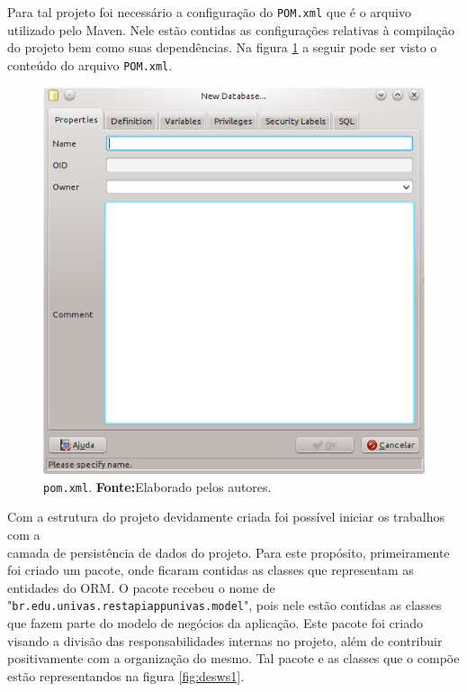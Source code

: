 	\par Para tal projeto foi necessário a configuração do \texttt{POM.xml} que é o
arquivo utilizado pelo Maven. Nele estão contidas as configurações
relativas à compilação do projeto bem como suas dependências.  Na figura
\ref{fig:desws} a seguir pode ser visto o conteúdo do arquivo
\texttt{POM.xml}.

\begin{figure}[h!]
	\centerline{\includegraphics[scale=0.8]{./imagens/2_q_metodologico/4_procedimentos_resultados/43_webservice/432_desenvolvimento/desws1.png}}
	\caption[\texttt{pom.xml}]{\texttt{pom.xml}.
		\textbf{Fonte:}Elaborado pelos autores.}
	\label{fig:desws}
\end{figure}

	

	\par Com a estrutura do projeto devidamente criada foi possível iniciar os
trabalhos com a \\ camada de persistência de dados do projeto. Para este
propósito, primeiramente foi criado um pacote, onde ficaram contidas as classes
que representam as entidades do ORM. O pacote recebeu o nome de
"\texttt{br.edu.univas.restapiappunivas.model}", pois nele estão contidas as
classes que fazem parte do modelo de negócios da aplicação. Este pacote foi
criado visando a divisão das responsabilidades internas no projeto, além de
contribuir positivamente com a organização do mesmo. Tal pacote e as classes
que o compõe estão representandos na figura \ref{fig:desws1}.

